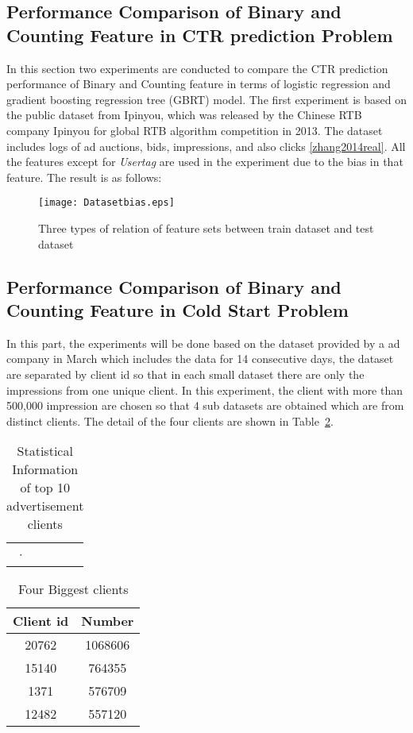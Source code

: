\subsection{Performance Comparison of Binary and Counting Feature in CTR prediction Problem}

In this section two experiments are conducted to compare the CTR prediction performance of Binary and Counting feature in terms of logistic regression and gradient boosting regression tree (GBRT) model. The first experiment is based on the public dataset from Ipinyou, which was released by the Chinese RTB company Ipinyou for global RTB algorithm competition in 2013. The dataset includes logs of ad auctions, bids, impressions, and also clicks \ref{zhang2014real}. All the features except for \textit{Usertag} are used in the experiment due to the bias in that feature. The result is as follows:





\begin{figure}[h]
\centering
\texttt{[image: Datasetbias.eps]}
\caption{Three types of relation of feature sets between train dataset and test dataset}
\label{fig:datasetbias}
\end{figure}

\subsection{Performance Comparison of Binary and Counting Feature in Cold Start Problem}

In this part, the experiments will be done based on the dataset provided by a ad company in March which includes the data for 14 consecutive days, the dataset are separated by client id so that in each small dataset there are only the impressions from one unique client. In this experiment, the client with more than 500,000 impression are chosen so that 4 sub datasets are obtained which are from distinct clients. The detail of the four clients are shown in Table~\ref{tab:campainid}.


\begin{table}[t]
\centering
\begin{tabular}{c | c | c | c }
· 
\end{tabular}
\caption{Statistical Information of top 10 advertisement clients}
\label{tab:campainid}
\end{table}

\iffalse
\begin{table}[t]
 \centering
 \begin{tabular}{ ||c c || } 
 \hline
 Client id  & Number \\
 \hline
 20762 & 1068606 \\ 
  15140 & 764355 \\ 
   1371 & 576709 \\ 
   12482 & 557120\\
 \hline
 \end{tabular}
 \caption{Four Biggest clients}
 \label{tab:campainid}
 \end{table}
 
